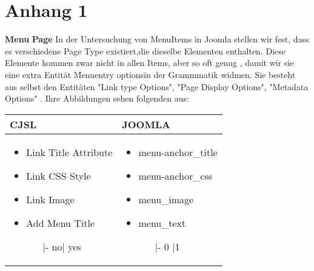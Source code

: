 \chapter{Anhang 1}
\textbf{Menu} \linebreak
\textbf{Page} \linebreak
In der Untersuchung von MenuItems in Joomla stellen wir fest, dass es verschiedene Page Type existiert,die dieselbe   Elementen enthalten. Diese Elemente kommen zwar nicht in allen Items, aber so oft genug , damit wir sie eine extra Entität \" Menuentry options\" in der Grammmatik widmen. Sie besteht aus selbst den Entitäten "Link type Options", "Page Display Options", "Metadata Options"  . Ihre Abbildungen sehen folgenden aus:
\linebreak
\linebreak
\begin{minipage}{0.5\textwidth}
\begin{tabular}{|p{}|p{} |}
\hline
\textbf{CJSL} 
&  
\textbf{JOOMLA} \\ \hline
\begin{itemize}
\item Link Title Attribute
\item Link CSS Style
\item Link Image
\item Add Menu Title
	\begin{enumerate}
	\item[|-]no| yes
	\end{enumerate}
\end{itemize}
&
\begin{itemize}
\item menu-anchor\_title
\item menu-anchor\_css
\item menu\_image
\item menu\_text
	\begin{enumerate}
		\item[|-] 0 |1
	\end{enumerate}
\end{itemize} \\ \hline
\end{tabular}
\end{minipage}

